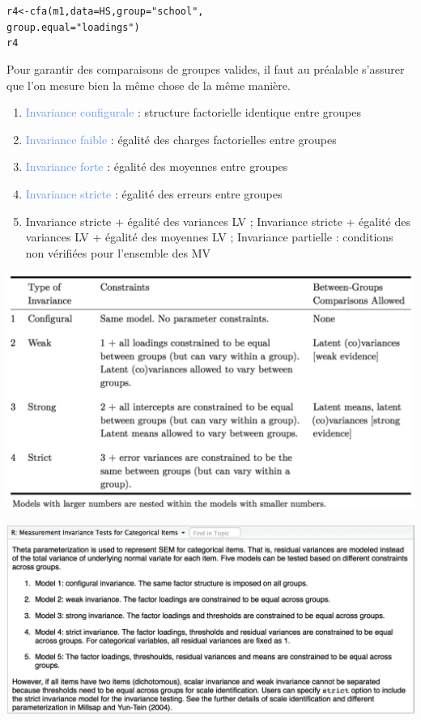 \begin{alltt}
r4 <- cfa(m1, data = HS, group = "school", 
          group.equal = "loadings")
r4
\end{alltt}


Pour garantir des comparaisons de groupes valides, il faut au préalable
s'assurer que l'on mesure bien la même chose de la même manière\autocite{teresi06}. 
\begin{enumerate}
\item \textcolor{CornflowerBlue}{Invariance configurale} : structure factorielle identique entre groupes
\item \textcolor{CornflowerBlue}{Invariance faible} : égalité des charges factorielles entre groupes
\item \textcolor{CornflowerBlue}{Invariance forte} : égalité des moyennes entre groupes
\item \textcolor{CornflowerBlue}{Invariance stricte} : égalité des erreurs entre groupes
\item Invariance stricte + égalité des variances LV ; Invariance stricte +
  égalité des variances LV + égalité des moyennes LV ; Invariance partielle :
  conditions non vérifiées pour l'ensemble des MV 
\end{enumerate}


{\centering \includegraphics[width=.7\textwidth]{figs/ivmeas.eps}\par}



{\centering \includegraphics[width=.7\textwidth]{figs/semTools.eps}\par}


